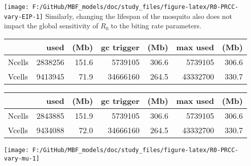 \documentclass[
]{article}
\begin{document}
\texttt{[image: F:/GitHub/MBF\_models/doc/study\_files/figure-latex/R0-PRCC-vary-EIP-1]}
Similarly, changing the lifespan of the mosquito also does not impact
the global sensitivity of \(R_0\) to the biting rate parameters.

\begin{longtable}[]{@{}lrrrrrr@{}}
\toprule\noalign{}
& used & (Mb) & gc trigger & (Mb) & max used & (Mb) \\
\midrule\noalign{}
\endhead
\bottomrule\noalign{}
\endlastfoot
Ncells & 2838256 & 151.6 & 5739105 & 306.6 & 5739105 & 306.6 \\
Vcells & 9413945 & 71.9 & 34666160 & 264.5 & 43332700 & 330.7 \\
\end{longtable}

\begin{longtable}[]{@{}lrrrrrr@{}}
\toprule\noalign{}
& used & (Mb) & gc trigger & (Mb) & max used & (Mb) \\
\midrule\noalign{}
\endhead
\bottomrule\noalign{}
\endlastfoot
Ncells & 2843885 & 151.9 & 5739105 & 306.6 & 5739105 & 306.6 \\
Vcells & 9434088 & 72.0 & 34666160 & 264.5 & 43332700 & 330.7 \\
\end{longtable}

\texttt{[image: F:/GitHub/MBF\_models/doc/study\_files/figure-latex/R0-PRCC-vary-mu-1]}
\end{document}
